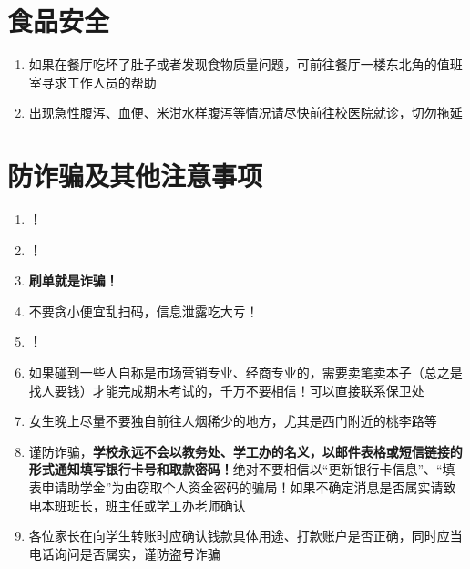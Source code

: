 \section[食品安全]{食品安全}
\begin{enumerate}
    \item 如果在餐厅吃坏了肚子或者发现食物质量问题，可前往餐厅一楼东北角的值班室寻求工作人员的帮助
    \item 出现急性腹泻、血便、米泔水样腹泻等情况请尽快前往校医院就诊，切勿拖延
\end{enumerate}

\section[防诈骗及其他注意事项]{防诈骗及其他注意事项}
\begin{enumerate}
    \item \textbf{！}
    \item \textbf{！}
    \item \textbf{刷单就是诈骗！}
    \item 不要贪小便宜乱扫码，信息泄露吃大亏！
    \item \textbf{！}
    \item 如果碰到一些人自称是市场营销专业、经商专业的，需要卖笔卖本子\footnotemark （总之是找人要钱）才能完成期末考试的，千万不要相信！可以直接联系保卫处
    \item 女生晚上尽量不要独自前往人烟稀少的地方，尤其是西门附近的桃李路等
    \item 谨防诈骗，\textbf{学校永远不会以教务处、学工办的名义，以邮件表格或短信链接的形式通知填写银行卡号和取款密码！}绝对不要相信以“更新银行卡信息”、“填表申请助学金”为由窃取个人资金密码的骗局！如果不确定消息是否属实请致电本班班长，班主任或学工办老师确认
    \item 各位家长在向学生转账时应确认钱款具体用途、打款账户是否正确，同时应当电话询问是否属实，谨防盗号诈骗
\end{enumerate}
